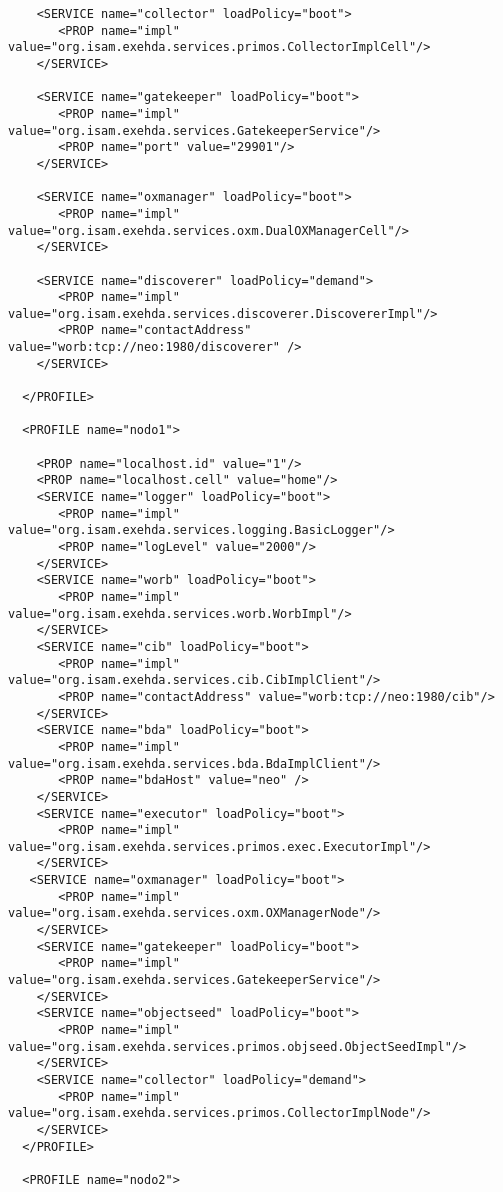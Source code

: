 \begin{scriptsize}
\begin{verbatim}
    <SERVICE name="collector" loadPolicy="boot">
       <PROP name="impl" value="org.isam.exehda.services.primos.CollectorImplCell"/>
    </SERVICE>

    <SERVICE name="gatekeeper" loadPolicy="boot">
       <PROP name="impl" value="org.isam.exehda.services.GatekeeperService"/>
       <PROP name="port" value="29901"/>
    </SERVICE>

    <SERVICE name="oxmanager" loadPolicy="boot">
       <PROP name="impl" value="org.isam.exehda.services.oxm.DualOXManagerCell"/>
    </SERVICE>

    <SERVICE name="discoverer" loadPolicy="demand">
       <PROP name="impl" value="org.isam.exehda.services.discoverer.DiscovererImpl"/>
       <PROP name="contactAddress" value="worb:tcp://neo:1980/discoverer" />
    </SERVICE>

  </PROFILE>
    
  <PROFILE name="nodo1">

    <PROP name="localhost.id" value="1"/>
    <PROP name="localhost.cell" value="home"/>
    <SERVICE name="logger" loadPolicy="boot">
       <PROP name="impl" value="org.isam.exehda.services.logging.BasicLogger"/>
       <PROP name="logLevel" value="2000"/>
    </SERVICE>
    <SERVICE name="worb" loadPolicy="boot">
       <PROP name="impl" value="org.isam.exehda.services.worb.WorbImpl"/>
    </SERVICE>
    <SERVICE name="cib" loadPolicy="boot">
       <PROP name="impl" value="org.isam.exehda.services.cib.CibImplClient"/>
       <PROP name="contactAddress" value="worb:tcp://neo:1980/cib"/>
    </SERVICE>
    <SERVICE name="bda" loadPolicy="boot">
       <PROP name="impl" value="org.isam.exehda.services.bda.BdaImplClient"/>
       <PROP name="bdaHost" value="neo" />
    </SERVICE>
    <SERVICE name="executor" loadPolicy="boot">
       <PROP name="impl" value="org.isam.exehda.services.primos.exec.ExecutorImpl"/>
    </SERVICE>
   <SERVICE name="oxmanager" loadPolicy="boot">
       <PROP name="impl" value="org.isam.exehda.services.oxm.OXManagerNode"/>
    </SERVICE>
    <SERVICE name="gatekeeper" loadPolicy="boot">
       <PROP name="impl" value="org.isam.exehda.services.GatekeeperService"/>
    </SERVICE>
    <SERVICE name="objectseed" loadPolicy="boot">
       <PROP name="impl" value="org.isam.exehda.services.primos.objseed.ObjectSeedImpl"/>
    </SERVICE>
    <SERVICE name="collector" loadPolicy="demand">
       <PROP name="impl" value="org.isam.exehda.services.primos.CollectorImplNode"/>
    </SERVICE>
  </PROFILE>

  <PROFILE name="nodo2">


\end{verbatim}
\end{scriptsize}
